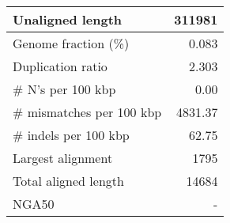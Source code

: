 \documentclass[12pt,a4paper]{article}
\begin{document}
\begin{table}[ht]
\begin{center}
\begin{tabular}{|l*{1}{|r}|}
Unaligned length & 311981 \\ \hline
Genome fraction (\%) & 0.083 \\ \hline
Duplication ratio & 2.303 \\ \hline
\# N's per 100 kbp & 0.00 \\ \hline
\# mismatches per 100 kbp & 4831.37 \\ \hline
\# indels per 100 kbp & 62.75 \\ \hline
Largest alignment & 1795 \\ \hline
Total aligned length & 14684 \\ \hline
NGA50 & - \\ \hline
\end{tabular}
\end{center}
\end{table}
\end{document}
